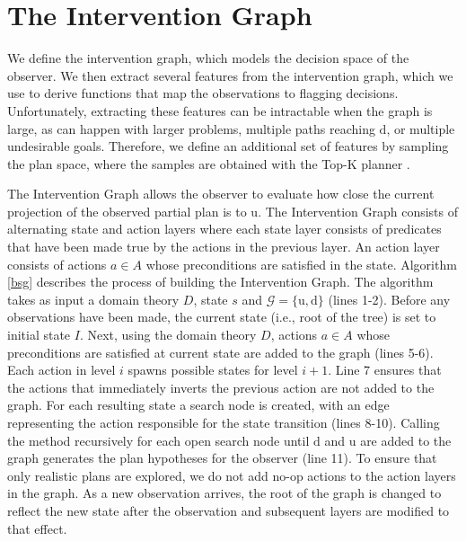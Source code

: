 \documentclass[doctor]{thesis} %
\theoremstyle{plain}
\begin{document}
\section*{The Intervention Graph}
\label{sec:stategraph}
We define the intervention graph, which models the decision space of the observer.
We then extract several features from the  intervention graph, which we use to derive functions that map the observations to flagging decisions.
Unfortunately, extracting these features can be intractable when the graph is large, as can happen with larger problems, multiple paths reaching $\mathrm{d}$, or multiple undesirable goals. Therefore, we define an additional set of features by sampling the plan space, where the samples are obtained with the Top-K planner \cite{riabov2014}.

The Intervention Graph allows the observer to evaluate how close the current projection of the observed partial plan is to $\mathrm{u}$. The Intervention Graph consists of alternating state and action layers where each state layer consists of predicates that have been made true by the actions in the previous layer. An action layer consists of actions $a\in A$ whose preconditions are satisfied in the state. Algorithm \ref{bsg} describes the process of building the Intervention Graph. The algorithm takes as input a domain theory $D$, state $s$ and $\mathcal{G}=\lbrace\mathrm{u},\mathrm{d}\rbrace$ (lines 1-2). Before any observations have been made, the current state (i.e., root of the tree) is set to initial state $I$. Next, using the domain theory $D$, actions  $a\in A$ whose preconditions are satisfied at current state are added to the graph (lines 5-6). Each action in level $i$ spawns possible states for level $i+1$. Line 7 ensures that the actions that immediately inverts the previous action are not added to the graph. For each resulting state a search node is created, with an edge representing the action responsible for the state transition (lines 8-10). Calling the method recursively for each open search node until $\mathrm{d}$ and $\mathrm{u}$ are added to the graph generates the plan hypotheses for the observer (line 11). To ensure that only realistic plans are explored, we do not add no-op actions to the action layers in the graph. As a new observation arrives, the root of the graph is changed to reflect the new state after the observation and subsequent layers are  modified to that effect.  
\end{document}

